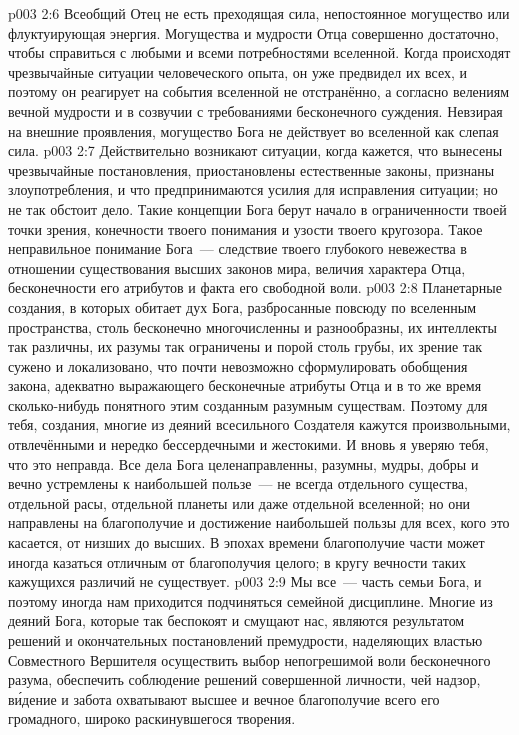 \vs p003 2:6 \pc Всеобщий Отец не есть преходящая сила, непостоянное могущество или флуктуирующая энергия. Могущества и мудрости Отца совершенно достаточно, чтобы справиться с любыми и всеми потребностями вселенной. Когда происходят чрезвычайные ситуации человеческого опыта, он уже предвидел их всех, и поэтому он реагирует на события вселенной не отстранённо, а согласно велениям вечной мудрости и в созвучии с требованиями бесконечного суждения. Невзирая на внешние проявления, могущество Бога не действует во вселенной как слепая сила.
\vs p003 2:7 Действительно возникают ситуации, когда кажется, что вынесены чрезвычайные постановления, приостановлены естественные законы, признаны злоупотребления, и что предпринимаются усилия для исправления ситуации; но не так обстоит дело. Такие концепции Бога берут начало в ограниченности твоей точки зрения, конечности твоего понимания и узости твоего кругозора. Такое неправильное понимание Бога~--- следствие твоего глубокого невежества в отношении существования высших законов мира, величия характера Отца, бесконечности его атрибутов и факта его свободной воли.
\vs p003 2:8 Планетарные создания, в которых обитает дух Бога, разбросанные повсюду по вселенным пространства, столь бесконечно многочисленны и разнообразны, их интеллекты так различны, их разумы так ограничены и порой столь грубы, их зрение так сужено и локализовано, что почти невозможно сформулировать обобщения закона, адекватно выражающего бесконечные атрибуты Отца и в то же время сколько\hyp{}нибудь понятного этим созданным разумным существам. Поэтому для тебя, создания, многие из деяний всесильного Создателя кажутся произвольными, отвлечёнными и нередко бессердечными и жестокими. И вновь я уверяю тебя, что это неправда. Все дела Бога целенаправленны, разумны, мудры, добры и вечно устремлены к наибольшей пользе~--- не всегда отдельного существа, отдельной расы, отдельной планеты или даже отдельной вселенной; но они направлены на благополучие и достижение наибольшей пользы для всех, кого это касается, от низших до высших. В эпохах времени благополучие части может иногда казаться отличным от благополучия целого; в кругу вечности таких кажущихся различий не существует.
\vs p003 2:9 Мы все~--- часть семьи Бога, и поэтому иногда нам приходится подчиняться семейной дисциплине. Многие из деяний Бога, которые так беспокоят и смущают нас, являются результатом решений и окончательных постановлений премудрости, наделяющих властью Совместного Вершителя осуществить выбор непогрешимой воли бесконечного разума, обеспечить соблюдение решений совершенной личности, чей надзор, в\'идение и забота охватывают высшее и вечное благополучие всего его громадного, широко раскинувшегося творения.
